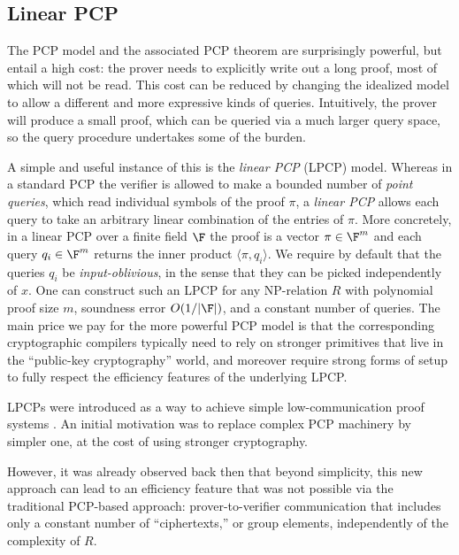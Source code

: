 \subsection{Linear PCP}
\label{paradigms:IT:linear-PCP}

The PCP model and the associated PCP theorem are surprisingly powerful, but entail a high cost: the prover needs to explicitly write out a long proof, most of which will not be read.
This cost can be reduced by changing the idealized model to allow a different and more expressive kinds of queries.
Intuitively, the prover will produce a small proof, which can be queried via a much larger query space, so the query procedure undertakes some of the burden. 
\loosen


A simple and useful instance of this is the {\em linear PCP} (LPCP) model.
Whereas in a standard PCP the verifier is allowed to make a bounded number of {\em point queries}, which read individual symbols of the proof $\pi$, a {\em linear PCP} allows each query to take an arbitrary linear combination of the entries of $\pi$.
More concretely, in a linear PCP over a finite field $\F$ the proof is a vector $\pi\in\F^m$ and each query $q_i\in\F^m$ returns the inner product $\langle \pi,q_i\rangle$.
We require by default that the queries $q_i$ be {\em input-oblivious}, in the sense that they can be picked independently of $x$.
One can construct such an LPCP for any NP-relation $R$ with polynomial proof size $m$,  soundness error $O(1/|\F|)$, and a constant number of queries.
The main price we pay for the more powerful PCP model is that the corresponding cryptographic compilers typically need to rely on stronger primitives that live in the ``public-key cryptography'' world, and moreover require strong forms of setup to fully respect the efficiency features of the underlying LPCP.

LPCPs were introduced as a way to achieve simple low-communication proof systems \cite{2007:IKO}.
An initial motivation was to replace complex PCP machinery by simpler one, at the cost of using stronger cryptography.

However, it was already observed back then that beyond simplicity,  this new approach can lead to an efficiency feature that was not possible via the traditional PCP-based approach: 
prover-to-verifier communication that includes only a constant number of ``ciphertexts,'' or group elements, independently of the complexity of $R$.


